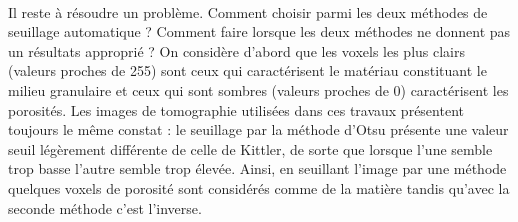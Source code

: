 			\paragraph{}Il reste à résoudre un problème. Comment choisir parmi les deux méthodes de seuillage automatique ? Comment faire lorsque les deux méthodes ne donnent pas un résultats approprié ? On considère d'abord que les voxels les plus clairs (valeurs proches de \num{255}) sont ceux qui caractérisent le matériau constituant le milieu granulaire et ceux qui sont sombres (valeurs proches de \num{0}) caractérisent les porosités. Les images de tomographie utilisées dans ces travaux présentent toujours le même constat : le seuillage par la méthode d'Otsu présente une valeur seuil légèrement différente de celle de Kittler, de sorte que lorsque l'une semble trop basse l'autre semble trop élevée. Ainsi, en seuillant l'image par une méthode quelques voxels de porosité sont considérés comme de la matière tandis qu'avec la seconde méthode c'est l'inverse.
